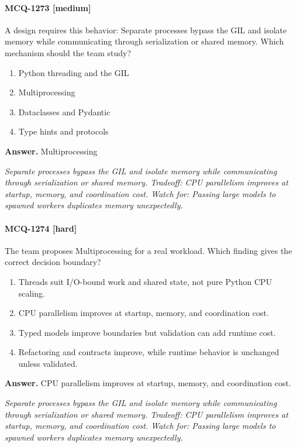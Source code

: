 \paragraph{MCQ-1273 [medium]} A design requires this behavior: Separate processes bypass the GIL and isolate memory while communicating through serialization or shared memory. Which mechanism should the team study?
\begin{enumerate}[label=\Alph*.]
\item Python threading and the GIL
\item Multiprocessing
\item Dataclasses and Pydantic
\item Type hints and protocols
\end{enumerate}
\noindent\textbf{Answer.} Multiprocessing
\par\textit{Separate processes bypass the GIL and isolate memory while communicating through serialization or shared memory. Tradeoff: CPU parallelism improves at startup, memory, and coordination cost. Watch for: Passing large models to spawned workers duplicates memory unexpectedly.}
\paragraph{MCQ-1274 [hard]} The team proposes Multiprocessing for a real workload. Which finding gives the correct decision boundary?
\begin{enumerate}[label=\Alph*.]
\item Threads suit I/O-bound work and shared state, not pure Python CPU scaling.
\item CPU parallelism improves at startup, memory, and coordination cost.
\item Typed models improve boundaries but validation can add runtime cost.
\item Refactoring and contracts improve, while runtime behavior is unchanged unless validated.
\end{enumerate}
\noindent\textbf{Answer.} CPU parallelism improves at startup, memory, and coordination cost.
\par\textit{Separate processes bypass the GIL and isolate memory while communicating through serialization or shared memory. Tradeoff: CPU parallelism improves at startup, memory, and coordination cost. Watch for: Passing large models to spawned workers duplicates memory unexpectedly.}

